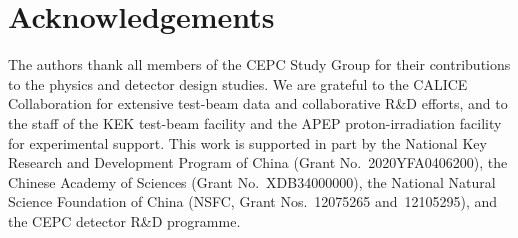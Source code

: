\section*{Acknowledgements}

The authors thank all members of the CEPC Study Group for their
contributions to the physics and detector design studies.
We are grateful to the CALICE Collaboration for extensive test-beam
data and collaborative R\&D efforts, and to the staff of the KEK
test-beam facility and the APEP proton-irradiation facility for
experimental support.
This work is supported in part by
the National Key Research and Development Program of China
(Grant No.~2020YFA0406200),
the Chinese Academy of Sciences (Grant No.~XDB34000000),
the National Natural Science Foundation of China (NSFC,
Grant Nos.~12075265 and~12105295),
and the CEPC detector R\&D programme.


